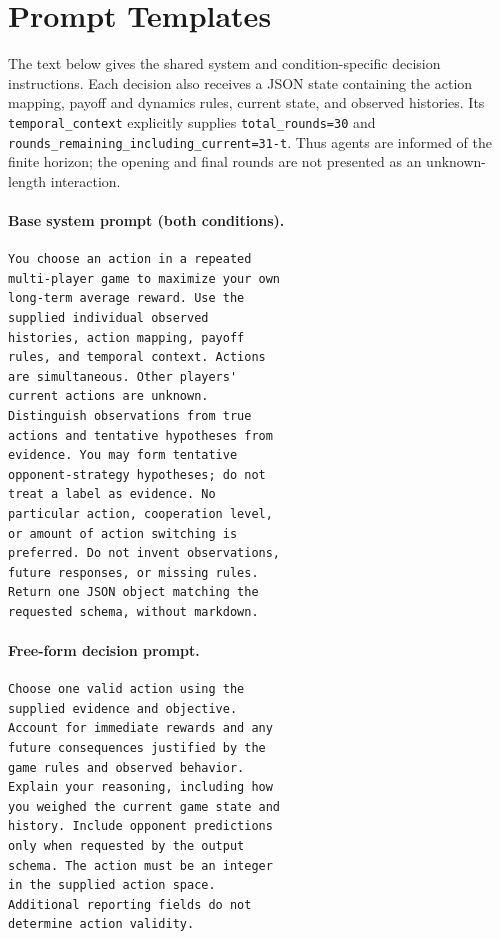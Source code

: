 \section{Prompt Templates}
\label{sec:appendix-prompts}

The text below gives the shared system and condition-specific decision
instructions. Each decision also receives a JSON state containing the action
mapping, payoff and dynamics rules, current state, and observed histories.
Its \texttt{temporal\_context} explicitly supplies
\texttt{total\_rounds=30} and
\texttt{rounds\_remaining\_including\_current=31-t}.
Thus agents are informed of the finite horizon; the opening and final rounds
are not presented as an unknown-length interaction.

\paragraph{Base system prompt (both conditions).}
\begin{verbatim}
You choose an action in a repeated
multi-player game to maximize your own
long-term average reward. Use the
supplied individual observed
histories, action mapping, payoff
rules, and temporal context. Actions
are simultaneous. Other players'
current actions are unknown.
Distinguish observations from true
actions and tentative hypotheses from
evidence. You may form tentative
opponent-strategy hypotheses; do not
treat a label as evidence. No
particular action, cooperation level,
or amount of action switching is
preferred. Do not invent observations,
future responses, or missing rules.
Return one JSON object matching the
requested schema, without markdown.
\end{verbatim}

\paragraph{Free-form decision prompt.}
\begin{verbatim}
Choose one valid action using the
supplied evidence and objective.
Account for immediate rewards and any
future consequences justified by the
game rules and observed behavior.
Explain your reasoning, including how
you weighed the current game state and
history. Include opponent predictions
only when requested by the output
schema. The action must be an integer
in the supplied action space.
Additional reporting fields do not
determine action validity.
\end{verbatim}


